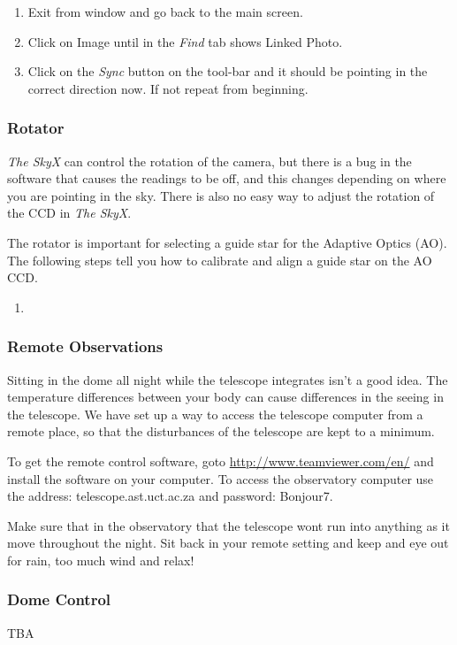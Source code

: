 \documentclass[12pt,twoside,a4paper]{report}
\begin{document}
\begin{enumerate}
 \item Exit from window and go back to the main screen.
 \item Click on Image until in the \emph{Find} tab shows Linked Photo.
 \item Click on the \emph{Sync} button on the tool-bar and it should be pointing in the correct direction now. If not repeat from beginning.
\end{enumerate}

\subsubsection{Rotator}
\label{Correcting_rotation}
\emph{The SkyX} can control the rotation of the camera, but there is a bug in the software that causes the readings to be off, and this changes depending on where you are pointing in the sky. There is also no easy way to adjust the rotation of the CCD in \emph{The SkyX}.

The rotator is important for selecting a guide star for the Adaptive Optics (AO). The following steps tell you how to calibrate and align a guide star on the AO CCD.
\begin{enumerate}
 \item 
\end{enumerate}


\subsubsection{Remote Observations}
\label{remote_obs}
Sitting in the dome all night while the telescope integrates isn't a good idea. The temperature differences between your body can cause differences in the seeing in the telescope. We have set up a way to access the telescope computer from a remote place, so that the disturbances of the telescope are kept to a minimum.

To get the remote control software, goto \url{http://www.teamviewer.com/en/} and install the software on your computer. To access the observatory computer use the address: telescope.ast.uct.ac.za and password: Bonjour7.

Make sure that in the observatory that the telescope wont run into anything as it move throughout the night. Sit back in your remote setting and keep and eye out for rain, too much wind and relax!

\subsubsection{Dome Control}
\label{Dome_control}
TBA
\label{dome_position}
\end{document}
